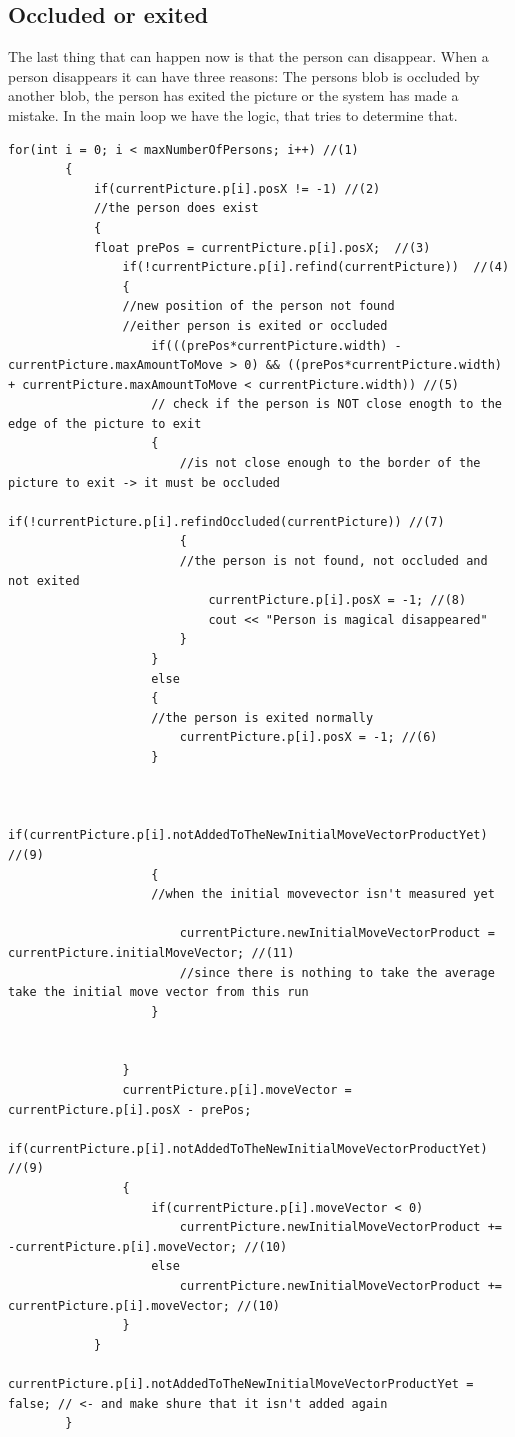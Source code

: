 \subsection{Occluded or exited}
The last thing that can happen now is that the person can disappear. When a person disappears it can have three reasons: The persons blob is occluded by another blob, the person has exited the picture or the system has made a mistake. In the main loop we have the logic, that tries to determine that. 
\begin{lstlisting}
for(int i = 0; i < maxNumberOfPersons; i++) //(1)
		{
			if(currentPicture.p[i].posX != -1) //(2)
			//the person does exist
			{
			float prePos = currentPicture.p[i].posX;  //(3)
				if(!currentPicture.p[i].refind(currentPicture))  //(4)
				{
				//new position of the person not found
				//either person is exited or occluded
					if(((prePos*currentPicture.width) - currentPicture.maxAmountToMove > 0) && ((prePos*currentPicture.width) + currentPicture.maxAmountToMove < currentPicture.width)) //(5)
					// check if the person is NOT close enogth to the edge of the picture to exit
					{
						//is not close enough to the border of the picture to exit -> it must be occluded
						if(!currentPicture.p[i].refindOccluded(currentPicture)) //(7)
						{
						//the person is not found, not occluded and not exited 
							currentPicture.p[i].posX = -1; //(8)
							cout << "Person is magical disappeared"
						}
					}
					else 
					{
					//the person is exited normally 
						currentPicture.p[i].posX = -1; //(6)
					}


					if(currentPicture.p[i].notAddedToTheNewInitialMoveVectorProductYet) //(9)
					{ 
					//when the initial movevector isn't measured yet
					
						currentPicture.newInitialMoveVectorProduct = currentPicture.initialMoveVector; //(11)
						//since there is nothing to take the average take the initial move vector from this run
					}


				}
				currentPicture.p[i].moveVector = currentPicture.p[i].posX - prePos;
				if(currentPicture.p[i].notAddedToTheNewInitialMoveVectorProductYet) //(9)
				{
					if(currentPicture.p[i].moveVector < 0)
						currentPicture.newInitialMoveVectorProduct += -currentPicture.p[i].moveVector; //(10)
					else
						currentPicture.newInitialMoveVectorProduct += currentPicture.p[i].moveVector; //(10)
				}
			}
			currentPicture.p[i].notAddedToTheNewInitialMoveVectorProductYet = false; // <- and make shure that it isn't added again
		}
\end{lstlisting}
